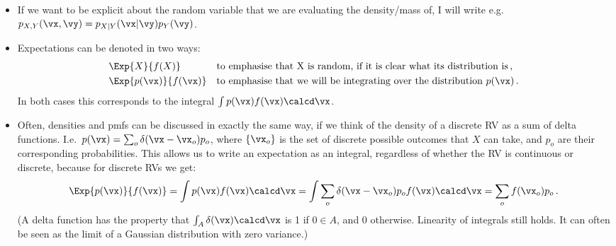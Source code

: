 \documentclass[a4paper]{article}
\theoremstyle{definition}
\begin{document}
\begin{itemize}
\item If we want to be explicit about the random variable that we are evaluating the density/mass of, I will write e.g.~$p_{X,Y}(\vx,\vy) = p_{X|Y}(\vx|\vy)p_Y(\vy)$.
\item Expectations can be denoted in two ways:
\begin{align}
    &\Exp{X}{f(X)} && \text{to emphasise that X is random, if it is clear what its distribution is}\,, \\
    &\Exp{p(\vx)}{f(\vx)} && \text{to emphasise that we will be integrating over the distribution $p(\vx)$} \,.
\end{align}
In both cases this corresponds to the integral $\int p(\vx) f(\vx) \calcd\vx$.
\item Often, densities and pmfs can be discussed in exactly the same way, if we think of the density of a discrete RV as a sum of delta functions. I.e.~$p(\vx) = \sum_{o} \delta(\vx - \vx_o) p_o$, where $\{\vx_o\}$ is the set of discrete possible outcomes that $X$ can take, and $p_o$ are their corresponding probabilities. This allows us to write an expectation as an integral, regardless of whether the RV is continuous or discrete, because for discrete RVs we get:
\begin{align}
\Exp{p(\vx)}{f(\vx)} = \int p(\vx) f(\vx) \calcd\vx = \int \sum_o \delta(\vx - \vx_o) p_o f(\vx) \calcd\vx = \sum_o f(\vx_o)p_o \,.
\end{align}
(A delta function has the property that $\int_A \delta(\vx) \calcd\vx$ is 1 if $0 \in A$, and 0 otherwise. Linearity of integrals still holds. It can often be seen as the limit of a Gaussian distribution with zero variance.)
\end{itemize}
\end{document}
